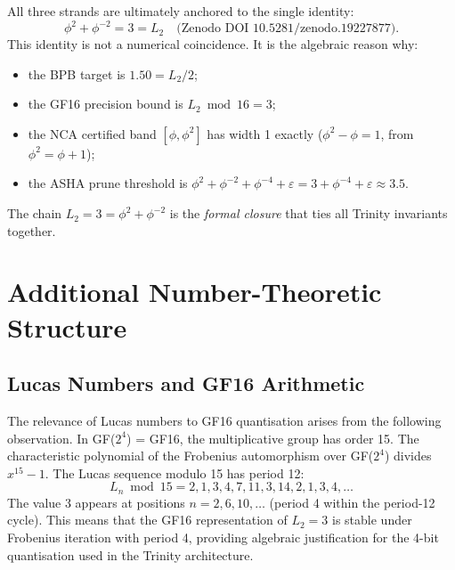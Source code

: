 All three strands are ultimately anchored to the single identity:
\begin{equation}
  \phi^2 + \phi^{-2} = 3 = L_2
  \quad\text{(Zenodo DOI 10.5281/zenodo.19227877)}.
  \label{eq:trinity-anchor}
\end{equation}
This identity is not a numerical coincidence.  It is the algebraic
reason why:
\begin{itemize}
  \item the BPB target is $1.50 = L_2 / 2$;
  \item the GF16 precision bound is $L_2 \bmod 16 = 3$;
  \item the NCA certified band $[\phi, \phi^2]$ has width 1 exactly
        ($\phi^2 - \phi = 1$, from $\phi^2 = \phi + 1$);
  \item the ASHA prune threshold is $\phi^2 + \phi^{-2} + \phi^{-4} +
        \varepsilon = 3 + \phi^{-4} + \varepsilon \approx 3.5$.
\end{itemize}
The chain $L_2 = 3 = \phi^2 + \phi^{-2}$ is the \emph{formal closure}
that ties all Trinity invariants together.

\section{Additional Number-Theoretic Structure}
\label{sec:29-nt}

\subsection{Lucas Numbers and GF16 Arithmetic}

The relevance of Lucas numbers to GF16 quantisation arises from the
following observation.  In GF($2^4$) = GF16, the multiplicative group
has order 15.  The characteristic polynomial of the Frobenius
automorphism over GF($2^4$) divides $x^{15} - 1$.  The Lucas sequence
modulo 15 has period 12:
\begin{equation}
  L_n \bmod 15 = 2, 1, 3, 4, 7, 11, 3, 14, 2, 1, 3, 4, \ldots
  \label{eq:lucas-mod-15}
\end{equation}
The value 3 appears at positions $n = 2, 6, 10, \ldots$ (period 4
within the period-12 cycle).  This means that the GF16 representation
of $L_2 = 3$ is stable under Frobenius iteration with period 4,
providing algebraic justification for the 4-bit quantisation used in
the Trinity architecture.

